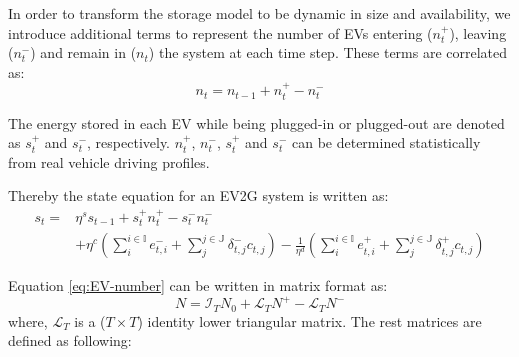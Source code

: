 
In order to transform the storage model to be dynamic in size and availability, we introduce additional terms to represent the number of EVs entering ($n_t^+$), leaving ($n_t^-$) and remain in ($n_t$) the system at each time step. These terms are correlated as:
\begin{equation}
\label{eq:EV-number}
n_t = n_{t-1} + n_t^+ - n_t^-
\end{equation}

The energy stored in each EV while being plugged-in or plugged-out are denoted as $s_t^+$ and $s_t^-$, respectively. $n_t^+$, $n_t^-$, $s_t^+$ and $s_t^-$ can be determined statistically from real vehicle driving profiles. 

Thereby the state equation for an EV2G system is written as:
\begin{equation}
\label{eq:tech-EV}
\begin{aligned}
s_t = & \eta^s s_{t-1} + s_t^+ n_t^+ - s_t^- n_t^- \\
&+ \eta^c \left(\sum_{i}^{i \in \mathbb{I}} e_{t,i}^{-} + \sum_{j}^{j \in \mathbb{J}}\delta_{t,j}^{-} c_{t,j}\right)- \frac{1}{\eta^d} \left(\sum_{i}^{i \in \mathbb{I}} e_{t,i}^{+} + \sum_{j}^{j \in \mathbb{J}}\delta_{t,j}^{+}c_{t,j}\right)
\end{aligned}
\end{equation} 
\newline

Equation \eqref{eq:EV-number} can be written in matrix format as:
\begin{equation}
\label{eq:EV-number-M}
N = \mathcal{I}_T N_0 + \mathcal{L}_T  N^+ -\mathcal{L}_T  N^- 
\end{equation}
where, $\mathcal{L}_T$ is a ($T \times T$) identity lower triangular matrix. The rest matrices are defined as following:


